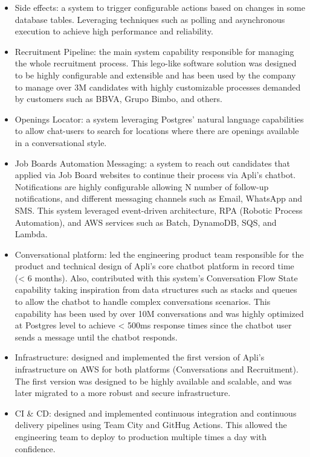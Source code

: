 \documentclass[9pt]{developercv} %
\begin{document}
\begin{entrylist}
{            \begin{itemize}
                \item Side effects: a system to trigger configurable actions based on changes in some database tables. Leveraging techniques such as polling and asynchronous execution to achieve high performance and reliability.
                \item Recruitment Pipeline: the main system capability responsible for managing the whole recruitment process. This lego-like software solution was designed to be highly configurable and extensible and has been used by the company to manage over 3M candidates with highly customizable processes demanded by customers such as BBVA, Grupo Bimbo, and others.
                \item Openings Locator: a system leveraging Postgres' natural language capabilities to allow chat-users to search for locations where there are openings available in a conversational style.
                \item Job Boards Automation Messaging: a system to reach out candidates that applied via Job Board websites to continue their process via Apli's chatbot. Notifications are highly configurable allowing N number of follow-up notifications, and different messaging channels such as Email, WhatsApp and SMS. This system leveraged event-driven architecture, RPA (Robotic Process Automation), and AWS services such as Batch, DynamoDB, SQS, and Lambda.
                \item Conversational platform: led the engineering product team responsible for the product and technical design of Apli's core chatbot platform in record time (< 6 months). Also, contributed with this system's Conversation Flow State capability taking inspiration from data structures such as stacks and queues to allow the chatbot to handle complex conversations scenarios. This capability has been used by over 10M conversations and was highly optimized at Postgres level to achieve < 500ms response times since the chatbot user sends a message until the chatbot responds.
                \item Infrastructure: designed and implemented the first version of Apli's infrastructure on AWS for both platforms (Conversations and Recruitment). The first version was designed to be highly available and scalable, and was later migrated to a more robust and secure infrastructure. 
                \item CI \& CD: designed and implemented continuous integration and continuous delivery pipelines using Team City and GitHug Actions. This allowed the engineering team to deploy to production multiple times a day with confidence.
            \end{itemize}

}
\end{entrylist}
\end{document}
